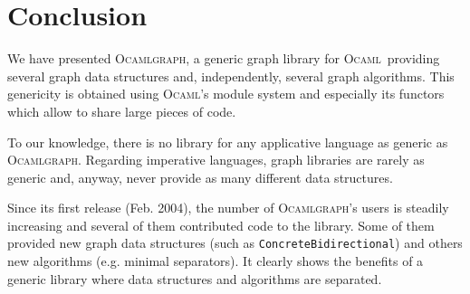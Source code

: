 \documentclass[tfpsymp]{tfp05symp}
\newcommand{\ocamlgraph}{\textsc{Ocamlgraph}\xspace}
\newcommand{\ocaml}{\textsc{Ocaml}\xspace}
\begin{document}
\section{Conclusion}

We have presented \ocamlgraph, a generic graph library for \ocaml\
providing several graph data structures and, independently, several
graph algorithms. This genericity is obtained using \ocaml's module
system and especially its functors which allow to share large pieces
of code.

To our knowledge, there is no library for any applicative language as
generic as \ocamlgraph. Regarding imperative languages, graph
libraries are rarely as generic and, anyway, never provide as many
different data structures.

Since its first release (Feb. 2004), the number of \ocamlgraph's users
is steadily increasing and several of them contributed code to the
library. Some of them provided new graph data structures (such as
\texttt{ConcreteBidirectional}) and others new algorithms
(e.g. minimal separators). It clearly shows the benefits of a generic
library where data structures and algorithms are separated.





\nocite{*}




\end{document}
